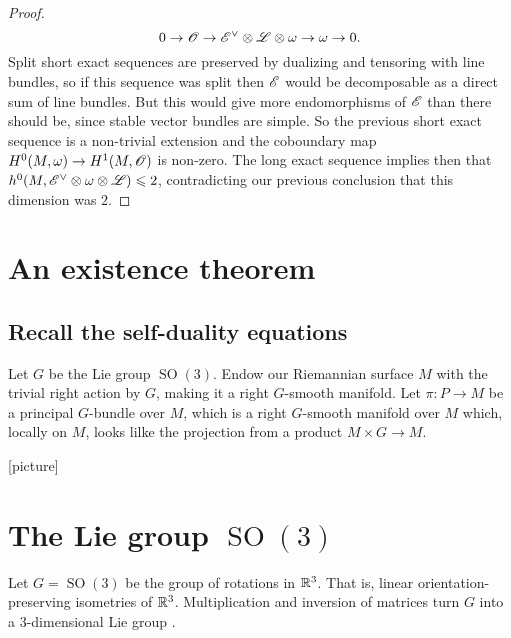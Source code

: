 \documentclass[A4paper, 12pt, british, reqno]{amsart}
\DeclareMathOperator{\SO}{SO}
\newcommand{\ot}{\otimes}
\newcommand{\dual}{^{\vee}}
\begin{document}
\begin{lm}
\begin{proof}
	\[ 0\to \O\to \E\dual\ot\L\ot\w\to \w\to 0. \]
	Split short exact sequences are preserved by dualizing and tensoring with line bundles, so if this sequence was split then $\mathscr{E}$ would be decomposable as a direct sum of line bundles.
	But this would give more endomorphisms of $\mathscr{E}$ than there should be, since stable vector bundles are simple.
	So the previous short exact sequence is a non-trivial extension and the coboundary map $H^{0}(M,\omega)\to H^{1}(M,\mathscr{O})$ is non-zero.
	The long exact sequence implies then that $h^{0}(M,\E\dual\ot \w\ot\L)\leqslant 2$, contradicting our previous conclusion that this dimension was $2$.
    \end{proof}
\end{lm}

\section{An existence theorem}

\subsection{Recall the self-duality equations}
Let $G$ be the Lie group $\SO(3)$.
Endow our Riemannian surface $M$ with the trivial right action by $G$, making it a right $G$-smooth manifold.
Let $\pi\colon P\to M$ be a principal $G$-bundle over $M$, which is a right $G$-smooth manifold over $M$ which, locally on $M$, looks lilke the projection from a product $M\times G\to M$.

[picture]

\appendix

\section{The Lie group $\SO(3)$}

Let $G=\SO(3)$ be the group of rotations in $\mathbb{R}^{3}$.
That is, linear orientation-preserving isometries of $\mathbb{R}^{3}$.
Multiplication and inversion of matrices turn $G$ into a $3$-dimensional Lie group \cite[Example 7.28]{lee13}.





\vfill
\end{document}
